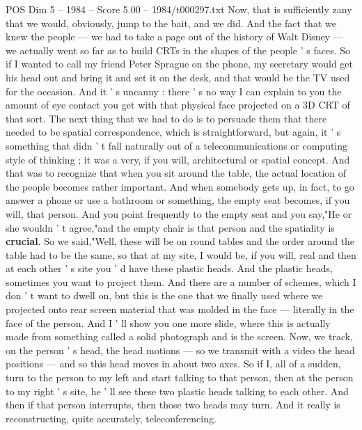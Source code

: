 \begin{textsample}{POS Dim 5 – 1984 – Score 5.00 – 1984/t000297.txt}
Now, that is sufficiently zany that we would, obviously, jump to the bait, and we did.
And the fact that we knew the people — we had to take a page out of the history of Walt Disney — we actually went so far as to build CRTs in the shapes of the people ' s faces.
So if I wanted to call my friend Peter Sprague on the phone, my secretary would get his head out and bring it and set it on the desk, and that would be the TV used for the occasion.
And it ' s uncanny : there ' s no way I can explain to you the amount of eye contact you get with that physical face projected on a 3D CRT of that sort.
The next thing that we had to do is to persuade them that there needed to be spatial correspondence, which is straightforward, but again, it ' s something that didn ' t fall naturally out of a telecommunications or computing style of thinking ; it was a very, if you will, architectural or spatial concept.
And that was to recognize that when you sit around the table, the actual location of the people becomes rather important.
And when somebody gets up, in fact, to go answer a phone or use a bathroom or something, the empty seat becomes, if you will, that person.
And you point frequently to the empty seat and you say,"He or she wouldn ' t agree,"and the empty chair is that person and the spatiality is \textbf{crucial}.
So we said,"Well, these will be on round tables and the order around the table had to be the same, so that at my site, I would be, if you will, real and then at each other ' s site you ' d have these plastic heads.
And the plastic heads, sometimes you want to project them.
And there are a number of schemes, which I don ' t want to dwell on, but this is the one that we finally used where we projected onto rear screen material that was molded in the face — literally in the face of the person.
And I ' ll show you one more slide, where this is actually made from something called a solid photograph and is the screen.
Now, we track, on the person ' s head, the head motions — so we transmit with a video the head positions — and so this head moves in about two axes.
So if I, all of a sudden, turn to the person to my left and start talking to that person, then at the person to my right ' s site, he ' ll see these two plastic heads talking to each other.
And then if that person interrupts, then those two heads may turn.
And it really is reconstructing, quite accurately, teleconferencing.

\end{textsample}
